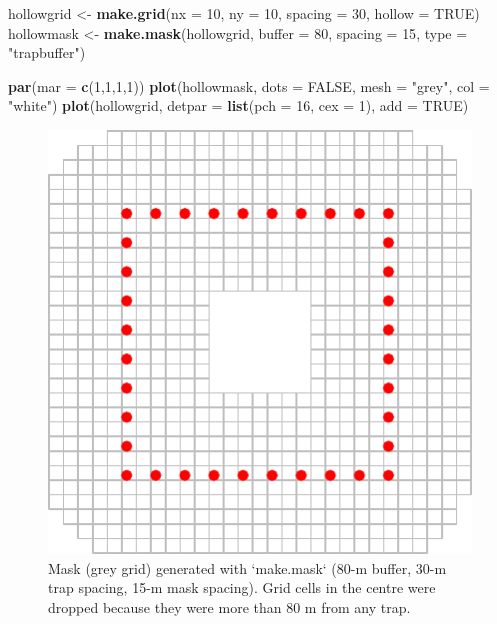\documentclass[
]{book}
\newenvironment{Shaded}{\begin{snugshade}}{\end{snugshade}}
\newcommand{\AttributeTok}[1]{\textcolor[rgb]{0.13,0.29,0.53}{#1}}
\newcommand{\ConstantTok}[1]{\textcolor[rgb]{0.56,0.35,0.01}{#1}}
\newcommand{\DecValTok}[1]{\textcolor[rgb]{0.00,0.00,0.81}{#1}}
\newcommand{\FunctionTok}[1]{\textcolor[rgb]{0.13,0.29,0.53}{\textbf{#1}}}
\newcommand{\NormalTok}[1]{#1}
\newcommand{\OtherTok}[1]{\textcolor[rgb]{0.56,0.35,0.01}{#1}}
\newcommand{\StringTok}[1]{\textcolor[rgb]{0.31,0.60,0.02}{#1}}
\begin{document}
\begin{Shaded}
\begin{Highlighting}[]
\NormalTok{hollowgrid }\OtherTok{\textless{}{-}} \FunctionTok{make.grid}\NormalTok{(}\AttributeTok{nx =} \DecValTok{10}\NormalTok{, }\AttributeTok{ny =} \DecValTok{10}\NormalTok{, }\AttributeTok{spacing =} \DecValTok{30}\NormalTok{, }\AttributeTok{hollow =} \ConstantTok{TRUE}\NormalTok{)}
\NormalTok{hollowmask }\OtherTok{\textless{}{-}} \FunctionTok{make.mask}\NormalTok{(hollowgrid, }\AttributeTok{buffer =} \DecValTok{80}\NormalTok{, }\AttributeTok{spacing =} \DecValTok{15}\NormalTok{, }\AttributeTok{type =} \StringTok{"trapbuffer"}\NormalTok{)}
\end{Highlighting}
\end{Shaded}

\begin{Shaded}
\begin{Highlighting}[]
\FunctionTok{par}\NormalTok{(}\AttributeTok{mar =} \FunctionTok{c}\NormalTok{(}\DecValTok{1}\NormalTok{,}\DecValTok{1}\NormalTok{,}\DecValTok{1}\NormalTok{,}\DecValTok{1}\NormalTok{))}
\FunctionTok{plot}\NormalTok{(hollowmask, }\AttributeTok{dots =} \ConstantTok{FALSE}\NormalTok{, }\AttributeTok{mesh =} \StringTok{"grey"}\NormalTok{, }\AttributeTok{col =} \StringTok{"white"}\NormalTok{)}
\FunctionTok{plot}\NormalTok{(hollowgrid, }\AttributeTok{detpar =} \FunctionTok{list}\NormalTok{(}\AttributeTok{pch =} \DecValTok{16}\NormalTok{, }\AttributeTok{cex =} \DecValTok{1}\NormalTok{), }\AttributeTok{add =} \ConstantTok{TRUE}\NormalTok{)}
\end{Highlighting}
\end{Shaded}

\begin{figure}

{\centering \includegraphics{SECRbook_files/figure-latex/simplemakemask-1} 

}

\caption{Mask (grey grid) generated with `make.mask` (80-m buffer, 30-m trap spacing, 15-m mask spacing). Grid cells in the centre were dropped because they were more than 80 m from any trap.}\label{fig:simplemakemask}
\end{figure}
\end{document}
